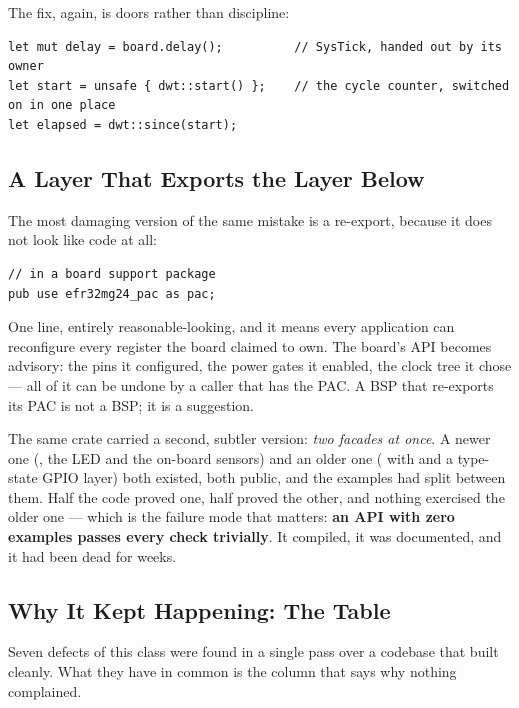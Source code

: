 The fix, again, is doors rather than discipline:

\begin{verbatim}
let mut delay = board.delay();          // SysTick, handed out by its owner
let start = unsafe { dwt::start() };    // the cycle counter, switched on in one place
let elapsed = dwt::since(start);
\end{verbatim}

\subsection{A Layer That Exports the Layer Below}

The most damaging version of the same mistake is a re-export, because it does not look like code
at all:

\begin{verbatim}
// in a board support package
pub use efr32mg24_pac as pac;
\end{verbatim}

One line, entirely reasonable-looking, and it means every application can reconfigure every
register the board claimed to own. The board's API becomes advisory: the pins it configured, the
power gates it enabled, the clock tree it chose — all of it can be undone by a caller that has the
PAC. A BSP that re-exports its PAC is not a BSP; it is a suggestion.

The same crate carried a second, subtler version: \emph{two facades at once}. A newer one
(, the LED and the on-board sensors) and an older one ( with
 and a type-state GPIO layer) both existed, both public, and the examples had
split between them. Half the code proved one, half proved the other, and nothing exercised the
older one — which is the failure mode that matters: \textbf{an API with zero examples passes every
check trivially}. It compiled, it was documented, and it had been dead for weeks.

\subsection{Why It Kept Happening: The Table}

Seven defects of this class were found in a single pass over a codebase that built cleanly. What
they have in common is the column that says why nothing complained.

